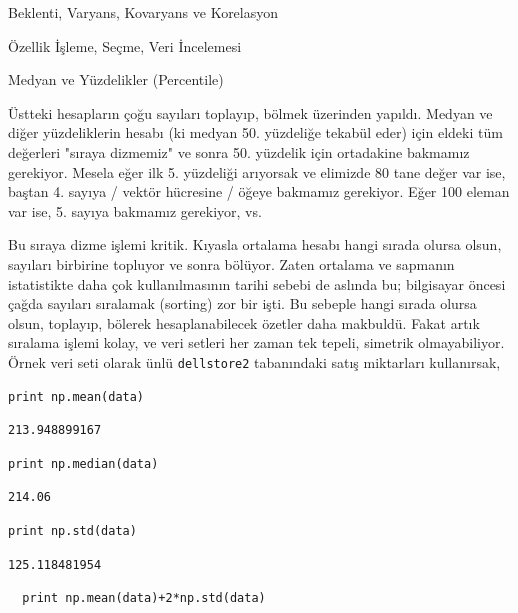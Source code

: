\documentclass[12pt,fleqn]{article}\usepackage{../../common}
\begin{document}
Beklenti, Varyans, Kovaryans ve Korelasyon

Özellik İşleme, Seçme, Veri İncelemesi

Medyan ve Yüzdelikler (Percentile)

Üstteki hesapların çoğu sayıları toplayıp, bölmek üzerinden yapıldı. Medyan
ve diğer yüzdeliklerin hesabı (ki medyan 50. yüzdeliğe tekabül eder) için
eldeki tüm değerleri "sıraya dizmemiz" ve sonra 50. yüzdelik için
ortadakine bakmamız gerekiyor. Mesela eğer ilk 5. yüzdeliği arıyorsak ve
elimizde 80 tane değer var ise, baştan 4. sayıya / vektör hücresine / öğeye
bakmamız gerekiyor. Eğer 100 eleman var ise, 5. sayıya bakmamız gerekiyor,
vs.

Bu sıraya dizme işlemi kritik. Kıyasla ortalama hesabı hangi sırada olursa
olsun, sayıları birbirine topluyor ve sonra bölüyor. Zaten ortalama ve
sapmanın istatistikte daha çok kullanılmasının tarihi sebebi de aslında bu;
bilgisayar öncesi çağda sayıları sıralamak (sorting) zor bir işti. Bu
sebeple hangi sırada olursa olsun, toplayıp, bölerek hesaplanabilecek
özetler daha makbuldü. Fakat artık sıralama işlemi kolay, ve veri setleri
her zaman tek tepeli, simetrik olmayabiliyor. Örnek veri seti olarak ünlü
\verb!dellstore2! tabanındaki satış miktarları kullanırsak,

\begin{verbatim}
print np.mean(data)
\end{verbatim}

\begin{verbatim}
213.948899167
\end{verbatim}

\begin{verbatim}
print np.median(data)
\end{verbatim}

\begin{verbatim}
214.06
\end{verbatim}

\begin{verbatim}
print np.std(data)
\end{verbatim}

\begin{verbatim}
125.118481954
\end{verbatim}

\begin{verbatim}
  print np.mean(data)+2*np.std(data)
\end{verbatim}
\end{document}
